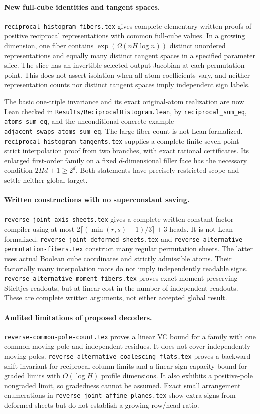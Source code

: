 \documentclass[11pt]{article}
\begin{document}
\paragraph{New full-cube identities and tangent spaces.}
\texttt{reciprocal-histogram-fibers.tex} gives complete elementary
written proofs of positive reciprocal representations with common
full-cube values. In a growing dimension, one fiber contains
$\exp(\Omega(nH\log n))$ distinct unordered representations and equally
many distinct tangent spaces in a specified parameter slice. The slice
has an invertible selected-output Jacobian at each permutation point.
This does not assert isolation when all atom coefficients vary, and
neither representation counts nor distinct tangent spaces imply
independent sign labels.

The basic one-triple invariance and its exact original-atom realization
are now Lean checked in \texttt{Results/ReciprocalHistogram.lean}, by
\texttt{reciprocal\_sum\_eq}, \texttt{atoms\_sum\_eq}, and the unconditional
concrete example \texttt{adjacent\_swaps\_atoms\_sum\_eq}.
The large fiber count is not Lean formalized.
\texttt{reciprocal-histogram-tangents.tex} supplies a complete finite
seven-point strict interpolation proof from two branches, with exact
rational certificates. Its enlarged first-order family on a fixed
$d$-dimensional filler face has the necessary condition
$2Hd+1\geq2^d$. Both statements have precisely restricted scope and
settle neither global target.

\paragraph{Written constructions with no superconstant saving.}
\texttt{reverse-joint-axis-sheets.tex} gives a complete written
constant-factor compiler using at most
$2\lceil(\min(r,s)+1)/3\rceil+3$ heads. It is not Lean formalized.
\texttt{reverse-joint-deformed-sheets.tex} and
\texttt{reverse-alternative-permutation-fibers.tex} construct many
regular permutation sheets. The latter uses actual Boolean cube
coordinates and strictly admissible atoms. Their factorially many
interpolation roots do not imply independently readable signs.
\texttt{reverse-alternative-moment-fibers.tex} proves exact
moment-preserving Stieltjes readouts, but at linear cost in the number of
independent readouts. These are complete written arguments, not either
accepted global result.

\paragraph{Audited limitations of proposed decoders.}
\texttt{reverse-common-pole-count.tex} proves a linear VC bound for a
family with one common moving pole and independent residues. It does
not cover independently moving poles.
\texttt{reverse-alternative-coalescing-flats.tex} proves a
backward-shift invariant for reciprocal-column limits and a linear
sign-capacity bound for graded limits with $O(\log H)$ profile
dimensions. It also exhibits a positive-pole nongraded limit, so
gradedness cannot be assumed. Exact small arrangement enumerations
in \texttt{reverse-joint-affine-planes.tex} show extra signs from
deformed sheets but do not establish a growing row/head ratio.
\end{document}
